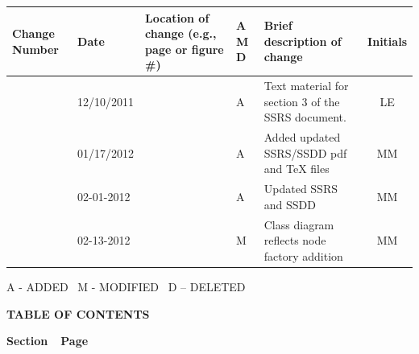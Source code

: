 \documentclass[twoside,letterpaper]{article}
\begin{document}
\begin{flushleft}
\tablehead{}
\begin{supertabular}[c]{|m{0.75in}|m{1.0in}|m{1.5in}|m{0.25in}|m{2in}|c|}
\hline

\centering \bfseries Change
\centering \bfseries Number
&

\centering \bfseries Date
\par
&

\centering \bfseries Location of change\newline
\centering \bfseries(e.g., page or figure \#)
&

\centering \bfseries A\newline
\centering \bfseries M\newline
\centering \bfseries D  
&

\centering \bfseries Brief description\newline
\centering \bfseries of change
&
\bfseries Initials
\\\hline

& 12/10/2011
& ~
& \centering A
& Text material for section 3 of the SSRS document.
& LE

\\\hline
{}
& 01/17/2012
& ~
& \centering A
& Added updated SSRS/SSDD pdf and TeX files
& MM

\\\hline
{}
& 02-01-2012
& ~
& \centering A
& Updated SSRS and SSDD
& MM

\\\hline
{}
& 02-13-2012
& ~
& \centering M
& Class diagram reflects node factory addition
& MM

\\\hline
\end{supertabular}
\end{flushleft}


{\color{black}
A - ADDED \ M - MODIFIED \ D -- DELETED}


{\centering{}\bfseries\color{black}
TABLE OF CONTENTS
\par}

{\bfseries\color{black}
Section\ \ Page}

\setcounter{tocdepth}{9}
\renewcommand\contentsname{}
\tableofcontents
\end{document}
